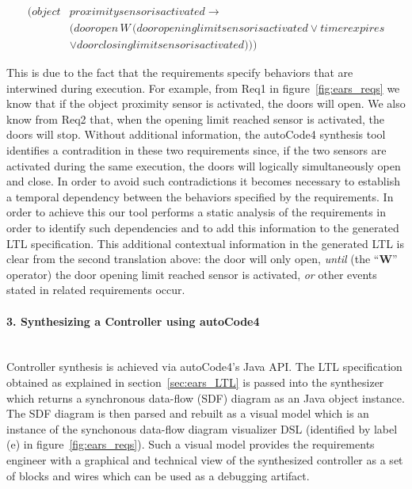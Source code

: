 \begin{align*}
[] (object&proximitysensorisactivated \rightarrow\\
 &(dooropen\,W\,(dooropeninglimitsensorisactivated \lor timerexpires\\
 & \lor doorclosinglimitsensorisactivated )))
\end{align*}

This is due to the fact that the requirements specify behaviors that are
interwined during execution. For example, from \textsf{Req1}  in
figure~\ref{fig:ears_reqs} we know that if the \textsf{object proximity sensor}
is activated, the doors will open. We also know from \textsf{Req2} that, when
the \textsf{opening limit reached} sensor is activated, the doors will stop.
Without additional information, the \textsf{autoCode4} synthesis tool identifies
a contradition in these two requirements since, if the two sensors are activated
during the same execution, the doors will logically simultaneously open and
close. In order to avoid such contradictions it becomes necessary to establish a
temporal dependency between the behaviors specified by the requirements. In
order to achieve this our tool performs a static analysis of the requirements
in order to identify such dependencies and to add this information to the
generated LTL specification.
This additional contextual information in the generated LTL is clear from the
second translation above:
the door will only open, \emph{until} (the ``\textbf{W}'' operator) the door \textsf{opening limit
reached} sensor is activated, \emph{or} other events stated in related
requirements occur.
 
\paragraph{3. Synthesizing a Controller using \textsf{autoCode4}\\\\}
 
Controller synthesis is achieved via \textsf{autoCode4}'s Java API. The LTL
specification obtained as explained in section~\ref{sec:ears_LTL} is passed into
the synthesizer which returns a synchronous data-flow (SDF) diagram as an Java
object instance. The SDF diagram is then parsed and rebuilt as a visual model
which is an instance of the synchonous data-flow diagram visualizer DSL
(identified by label (\textsf{e}) in figure~\ref{fig:ears_reqs}). Such a visual
model provides the requirements engineer with a graphical and technical view of
the synthesized controller as a set of blocks and wires which can be used as a
debugging artifact.

